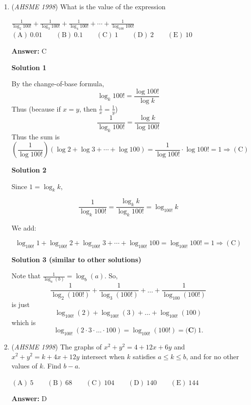 \begin{enumerate}
 


 


	\item (\textit{AHSME 1998}) What is the value of the expression


 $\frac {1}{\log_{2}100!} + \frac {1}{\log_{3}100!} + \frac {1}{\log_{4}100!} + \cdots + \frac {1}{\log_{100}100!}$
$\mathrm{(A) \ }0.01 \qquad \mathrm{(B) \ }0.1 \qquad \mathrm{(C) \ }1 \qquad \mathrm{(D) \ }2 \qquad \mathrm{(E) \ } 10$

 \textbf{Answer: }C



\textbf{Solution 1}

By the change-of-base formula, 
 \[\log_{k} 100! = \frac{\log 100!}{\log k}\]  Thus (because if $x=y$, then $\frac{1}{x}=\frac{1}{y}$)
 \[\frac{1}{\log_k 100!} = \frac{\log k}{\log 100!}\]Thus the sum is 
 \[\left(\frac{1}{\log 100!}\right)(\log 2 + \log 3 + \cdots + \log 100) = \frac{1}{\log 100!} \cdot \log 100! = 1 \Rightarrow \mathrm{(C)}\]




\textbf{Solution 2}

Since $1=\log_{k} k$,

 
 \[\frac{1}{\log_{k}100!}=\frac{\log_{k}k}{\log_{k}100!}=\log_{100!} k\]

 We add:

 
 \[\log_{100!} 1 +\log_{100!} 2 +\log_{100!} 3 +\cdots + \log_{100!} 100=\log_{100!}100!=1 \Rightarrow \mathrm{(C)}\]




\textbf{Solution 3 (similar to other solutions)}

Note that $\frac{1}{\log_a (b)} = \log_b(a)$. So,
 \[\frac{1}{\log_2(100!)} + \frac{1}{\log_3(100!)}+ \dots + \frac{1}{\log_{100}(100!)}\]is just
 \[\log_{100!}(2) + \log_{100!}(3) + \dots + \log_{100!}(100)\]which is
 \[\log_{100!}(2 \cdot 3 \cdot \dots \cdot 100) = \log_{100!}(100!) = \boxed{\textbf{(C)}\ 1}.\]



	\item (\textit{AHSME 1998}) The graphs of $x^2 + y^2 = 4 + 12x + 6y$ and $x^2 + y^2 = k + 4x + 12y$ intersect when $k$ satisfies $a \le k \le b$, and for no other values of $k$. Find $b-a$.


 $\mathrm{(A) \ }5 \qquad \mathrm{(B) \ }68 \qquad \mathrm{(C) \ }104 \qquad \mathrm{(D) \ }140 \qquad \mathrm{(E) \ }144$

 \textbf{Answer: }D




\end{enumerate}
